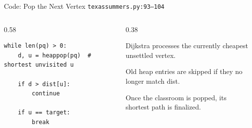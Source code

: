 \documentclass[aspectratio=169,11pt]{beamer}
\begin{document}
\begin{frame}[fragile]{Code: Pop the Next Vertex}
\scriptsize
{} \texttt{texassummers.py:93--104}

\vspace{0.08cm}
\begin{columns}[T,totalwidth=\textwidth]
\begin{column}{0.58\textwidth}
\begin{lstlisting}[style=cpcode]
while len(pq) > 0:
    d, u = heappop(pq)  # shortest unvisited u

    if d > dist[u]:
        continue

    if u == target:
        break
\end{lstlisting}
\end{column}
\begin{column}{0.38\textwidth}
\begin{tightitemize}
  \item Dijkstra processes the currently cheapest unsettled vertex.
  \item Old heap entries are skipped if they no longer match dist.
  \item Once the classroom is popped, its shortest path is finalized.
\end{tightitemize}
\end{column}
\end{columns}
\end{frame}
\end{document}
